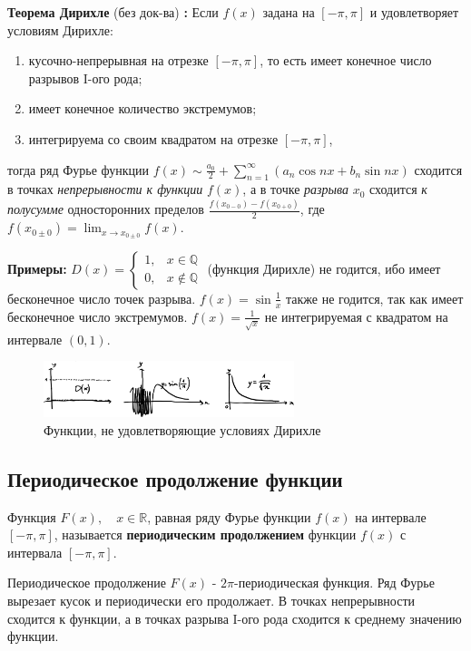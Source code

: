 \documentclass[12pt, a4paper]{article}
\begin{document}
\textbf{Теорема Дирихле} (без док-ва) \textbf{:} Если $f(x)$ задана на $[-\pi, \pi]$ и удовлетворяет условиям Дирихле:
\begin{enumerate}
 \item кусочно-непрерывная на отрезке $[-\pi, \pi]$, то есть имеет конечное число разрывов I-ого рода;
 \item имеет конечное количество экстремумов;
 \item интегрируема со своим квадратом на отрезке $[-\pi, \pi]$,
\end{enumerate}
тогда ряд Фурье функции $f(x) \sim \frac{a_0}{2} + \sum_{n=1}^{\infty} (a_n \cos nx + b_n \sin nx)$ сходится в точках \textit{непрерывности к функции} $f(x)$, а в точке \textit{разрыва} $x_0$ сходится \textit{к полусумме} односторонних пределов $\frac{f(x_{0-0}) - f(x_{0+0})}{2}$, где $f(x_{0 \pm 0}) = \lim_{x \to x_{0 \pm 0}} f(x)$.

\textbf{Примеры:} $D(x) = \begin{cases} 1, & x \in \mathbb{Q} \\ 0, & x \notin \mathbb{Q} \end{cases}$ (функция Дирихле) не годится, ибо имеет бесконечное число точек разрыва. $f(x) = \sin \frac{1}{x}$ также не годится, так как имеет бесконечное число экстремумов. $f(x) = \frac{1}{\sqrt{x}}$ не интегрируемая с квадратом на интервале $(0, 1)$.

\begin{figure}[h]
 \centering
 \includegraphics[width=0.65\textwidth]{11}
 \vspace{-4mm}
 \caption{Функции, не удовлетворяющие условиях Дирихле}
\end{figure}

\subsection{Периодическое продолжение функции}

Функция $F(x), \quad x \in \mathbb{R}$, равная ряду Фурье функции $f(x)$ на интервале $[-\pi, \pi]$, называется \textbf{периодическим продолжением} функции $f(x)$ с интервала $[-\pi, \pi]$.

Периодическое продолжение $F(x)$ - $2\pi$-периодическая функция. Ряд Фурье вырезает кусок и периодически его продолжает. В точках непрерывности сходится к функции, а в точках разрыва I-ого рода сходится к среднему значению функции.
\end{document}
